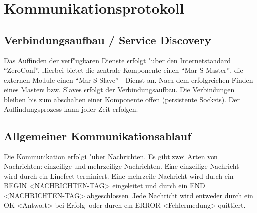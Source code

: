 
\chapter{Kommunikationsprotokoll}

\section{Verbindungsaufbau / Service Discovery}
Das Auffinden der verf"ugbaren Dienste erfolgt "uber den Internetstandard
``ZeroConf''. Hierbei bietet die zentrale Komponente einen ``Mar-S-Master'',
die externen Module einen  ``Mar-S-Slave'' - Dienst an. Nach dem erfolgreichen 
Finden eines Masters bzw. Slaves erfolgt der Verbindungsaufbau. Die Verbindungen 
bleiben bis zum abschalten einer Komponente offen (persistente Sockets). Der
Auffindungsprozess kann jeder Zeit erfolgen. 
\section{Allgemeiner Kommunikationsablauf}
Die Kommunikation erfolgt "uber Nachrichten. Es gibt zwei Arten von Nachrichten:
einzeilige und mehrzeilige Nachrichten. Eine einzeilige Nachricht wird durch ein Linefeet 
terminiert. Eine mehrzeile Nachricht wird durch ein
BEGIN <NACHRICHTEN-TAG> eingeleitet und durch ein END <NACHRICHTEN-TAG> abgeschlossen.
Jede Nachricht wird entweder durch ein OK <Antwort> bei Erfolg, oder durch ein ERROR <Fehlermedung>
quittiert. 
